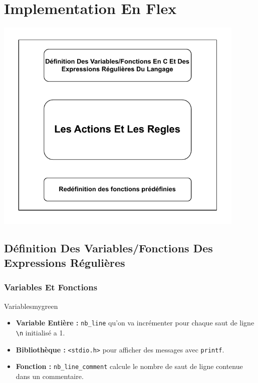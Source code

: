 \newpage
\section{Implementation En Flex}

\begin{center}
    \includegraphics[width=0.9\textwidth]{Parts/flex.drawio.pdf}
\end{center}

\newpage
\subsection{Définition Des Variables/Fonctions Des Expressions Régulières}

\subsubsection{Variables Et Fonctions}
\begin{prettyBox}{Variables}{mygreen}
\begin{itemize}
    \item \textbf{Variable Entière : }\texttt{nb\_line} qu'on va incrémenter 
pour chaque saut de ligne \texttt{\textbackslash n} initialisé a 1.
    \item \textbf{Bibliothèque : }\texttt{<stdio.h>} pour afficher des messages avec 
\texttt{printf}.
    \item \textbf{Fonction : }\texttt{nb\_line\_comment} calcule le nombre de saut de ligne 
        contenue dans un commentaire.
\end{itemize}
\end{prettyBox}

